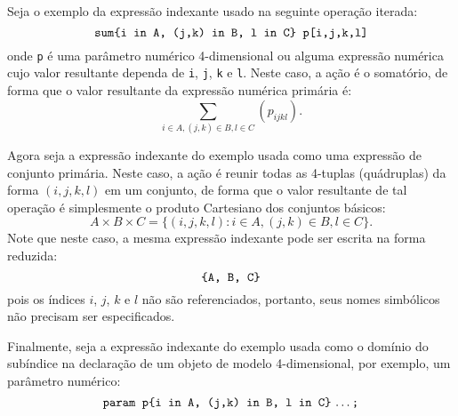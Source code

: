 \documentclass[11pt, brazil]{report}
\begin{document}
Seja o exemplo da expressão indexante usado na seguinte
operação iterada:
$$\mbox{{\tt sum\{i in A, (j,k) in B, l in C\} p[i,j,k,l]}}$$
onde {\tt p} é uma parâmetro numérico 4-dimensional ou alguma
expressão numérica cujo valor resultante dependa de
{\tt i}, {\tt j}, {\tt k} e {\tt l}. Neste caso, a ação é o somatório,
de forma que o valor resultante da expressão numérica primária é:
$$\sum_{i\in A,(j,k)\in B,l\in C}(p_{ijkl}).$$


Agora seja a expressão indexante do exemplo usada como uma expressão
de conjunto primária. Neste caso, a ação é reunir todas as 4-tuplas
(quádruplas) da forma $(i,j,k,l)$ em um conjunto, de forma que o
valor resultante de tal operação é simplesmente o produto
Cartesiano dos conjuntos básicos:
$$A\times B\times C=\{(i,j,k,l):i\in A,(j,k)\in B,l\in C\}.$$
Note que neste caso, a mesma expressão indexante pode ser escrita
na forma reduzida:
$$\mbox{{\tt\{A, B, C\}}}$$
pois os índices $i$, $j$, $k$ e $l$ não são referenciados, portanto,
seus nomes simbólicos não precisam ser especificados.


\newpage

Finalmente, seja a expressão indexante do exemplo usada como o domínio do
subíndice na declaração de um objeto de modelo 4-dimensional, por exemplo,
um parâmetro numérico:
$$\mbox{{\tt param p\{i in A, (j,k) in B, l in C\}} \dots {\tt;}}$$
\end{document}
